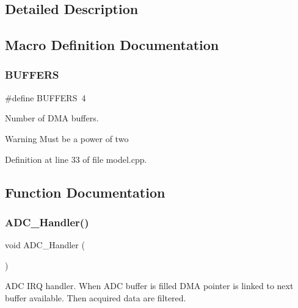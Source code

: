 \subsection{Detailed Description}


\subsection{Macro Definition Documentation}
\mbox{\label{group___board__model__group_gaabe0f927d44a09f458bd5fe5ab4e2f7f}} 
\subsubsection{\texorpdfstring{B\+U\+F\+F\+E\+RS}{BUFFERS}}
{\footnotesize\ttfamily \#define B\+U\+F\+F\+E\+RS~4}



Number of D\+MA buffers. 

\begin{DoxyWarning}{Warning}
Must be a power of two 
\end{DoxyWarning}


Definition at line 33 of file model.\+cpp.



\subsection{Function Documentation}
\mbox{\label{group___board__model__group_gaedc241164d501dcbc52cde232333c9cf}} 
\subsubsection{\texorpdfstring{A\+D\+C\+\_\+\+Handler()}{ADC\_Handler()}}
{\footnotesize\ttfamily void A\+D\+C\+\_\+\+Handler (\begin{DoxyParamCaption}{ }\end{DoxyParamCaption})}



A\+DC I\+RQ handler. When A\+DC buffer is filled D\+MA pointer is linked to next buffer available. Then acquired data are filtered. 

